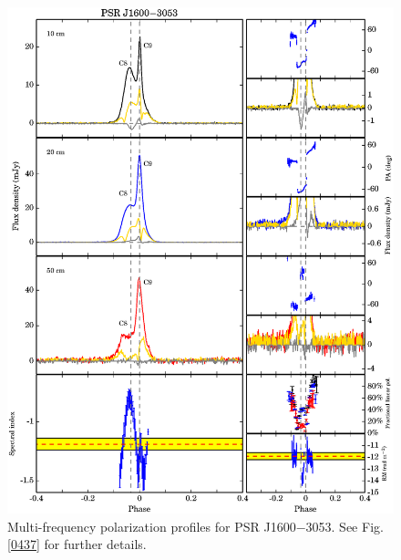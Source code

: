 \documentclass[useAMS,usenatbib]{mn2e}
\begin{document}
\begin{appendices}
\begin{figure}
\begin{center}
\includegraphics[width=6 in]{1600.ps}
\caption{Multi-frequency polarization profiles for PSR J1600$-$3053. 
See Fig. \ref{0437} for further details.}
\label{1600}
\end{center}
\end{figure}


\end{appendices}
\end{document}
